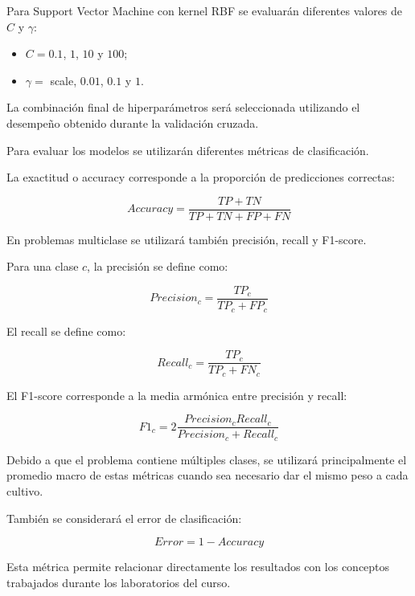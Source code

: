 \documentclass[conference]{IEEEtran}
\begin{document}
Para Support Vector Machine con kernel RBF se evaluarán diferentes valores de $C$ y $\gamma$:

\begin{itemize}
    \item $C=0.1$, $1$, $10$ y $100$;
    \item $\gamma=$ scale, $0.01$, $0.1$ y $1$.
\end{itemize}

La combinación final de hiperparámetros será seleccionada utilizando el desempeño obtenido durante la validación cruzada.



Para evaluar los modelos se utilizarán diferentes métricas de clasificación.

La exactitud o accuracy corresponde a la proporción de predicciones correctas:

\begin{equation}
Accuracy =
\frac{TP+TN}{TP+TN+FP+FN}
\end{equation}

En problemas multiclase se utilizará también precisión, recall y F1-score.

Para una clase $c$, la precisión se define como:

\begin{equation}
Precision_c =
\frac{TP_c}{TP_c+FP_c}
\end{equation}

El recall se define como:

\begin{equation}
Recall_c =
\frac{TP_c}{TP_c+FN_c}
\end{equation}

El F1-score corresponde a la media armónica entre precisión y recall:

\begin{equation}
F1_c =
2\frac{Precision_c Recall_c}
{Precision_c+Recall_c}
\end{equation}

Debido a que el problema contiene múltiples clases, se utilizará principalmente el promedio macro de estas métricas cuando sea necesario dar el mismo peso a cada cultivo.

También se considerará el error de clasificación:

\begin{equation}
Error=1-Accuracy
\end{equation}

Esta métrica permite relacionar directamente los resultados con los conceptos trabajados durante los laboratorios del curso.
\end{document}
